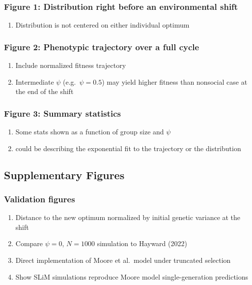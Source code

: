 \documentclass[12pt]{article}
\begin{document}
\subsubsection{Figure 1: Distribution right before an environmental shift}
\begin{enumerate}
    \item Distribution is not centered on either individual optimum
\end{enumerate}

\subsubsection{Figure 2: Phenotypic trajectory over a full cycle}
\begin{enumerate}
    \item Include normalized fitness trajectory
    \item Intermediate $\psi$ (e.g.\ $\psi=0.5$) may yield higher fitness than nonsocial case at the end of the shift
\end{enumerate}

\subsubsection{Figure 3: Summary statistics}
\begin{enumerate}
    \item Some stats shown as a function of group size and $\psi$
    \item could be describing the exponential fit to the trajectory or the distribution
\end{enumerate}

\subsection{Supplementary Figures}

\subsubsection{Validation figures}
\begin{enumerate}
    \item Distance to the new optimum normalized by initial genetic variance at the shift
    \item Compare $\psi=0$, $N=1000$ simulation to Hayward (2022)
    \item Direct implementation of Moore et al.\ model under truncated selection
    \item Show SLiM simulations reproduce Moore model single-generation predictions
\end{enumerate}
\end{document}
